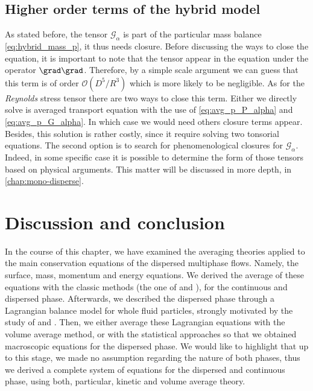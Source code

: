 \subsection{Higher order terms of the hybrid model}

As stated before, the tensor $\mathcal{G}_\alpha$ is part of the particular mass balance \ref{eq:hybrid_mass_p}, it thus needs closure. 
Before discussing the ways to close the equation, it is important to note that the tensor appear in the equation under the operator $\grad \grad$. 
Therefore, by a simple scale argument we can guess that this term is of order $\mathcal{O}(D^5 / R^3)$ which is more likely to be negligible. 
As for the \textit{Reynolds} stress tensor there are two ways to close this term. 
Either we directly solve is averaged transport equation with the use of \ref{eq:avg_p_P_alpha} and \ref{eq:avg_p_G_alpha}.
In which case we would need others closure terms appear. 
Besides, this solution is rather costly, since it require solving two tonsorial equations. 
The second option is to search for phenomenological closures for $\mathcal{G}_\alpha$. 
Indeed, in some specific case it is possible to determine the form of those tensors based on physical arguments. 
This matter will be discussed in more depth, in \ref{chap:mono-disperse}.



\section{Discussion and conclusion}

In the course of this chapter, we have examined the averaging theories applied to the main conservation equations of the dispersed multiphase flows. 
Namely, the surface, mass, momentum and energy equations. 
We derived the average of these equations with the classic methods (the one of \citet{drew1983mathematical} and \citet{kataoka1986local}), for the continuous  and dispersed phase. 
Afterwards, we described the dispersed phase through a Lagrangian balance model for whole fluid particles, strongly motivated by the study of \cite{morel2015mathematical} and \citet{zaepffel2011modelisation}. 
Then, we either average these Lagrangian equations with the volume average method, or with the statistical approaches so that we obtained macroscopic equations for the dispersed phase. 
We would like to highlight that up to this stage, we made no assumption regarding the nature of both phases, thus we derived a complete system of equations for the dispersed and continuous phase, using both, particular, kinetic and volume average theory.


